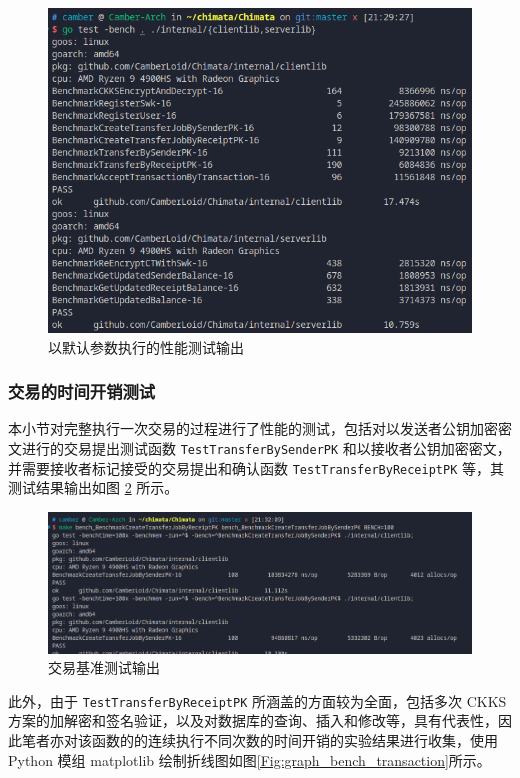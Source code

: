 \begin{figure}[ht]
    \centering
    \includegraphics[width=0.9\linewidth]{./Figures/Bench_Overall.png}
    \caption{以默认参数执行的性能测试输出}\label{Fig:benchmark}
\end{figure}

\subsubsection{交易的时间开销测试}

本小节对完整执行一次交易的过程进行了性能的测试，包括对以发送者公钥加密密文进行的交易提出测试函数 \verb|TestTransferBySenderPK| 和以接收者公钥加密密文，并需要接收者标记接受的交易提出和确认函数 \verb|TestTransferByReceiptPK| 等，其测试结果输出如图 \ref{Fig:bench_transaction} 所示。

\begin{figure}
    \centering
    \includegraphics[width=0.9\linewidth]{./Figures/Bench_Transaction_all.png}
    \caption{交易基准测试输出}\label{Fig:bench_transaction}
\end{figure}

此外，由于 \verb|TestTransferByReceiptPK| 所涵盖的方面较为全面，包括多次 CKKS 方案的加解密和签名验证，以及对数据库的查询、插入和修改等，具有代表性，因此笔者亦对该函数的的连续执行不同次数的时间开销的实验结果进行收集，使用 Python 模组 matplotlib 绘制折线图如图\ref{Fig:graph_bench_transaction}所示。

